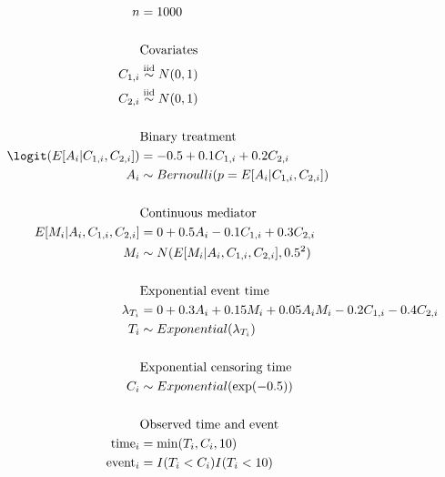 \documentclass[dvipdfmx,10pt]{article}
\begin{document}
\begin{align*}
  n
  &= 1000\\
  \\
  &\text{Covariates}\\
  C_{1,i} &\overset{\text{iid}}{\sim} N(0,1)\\
  C_{2,i} &\overset{\text{iid}}{\sim} N(0,1)\\
  \\
  &\text{Binary treatment}\\
  \logit(E[A_{i} | C_{1,i}, C_{2,i}])
  &= -0.5 + 0.1 C_{1,i} + 0.2 C_{2,i}\\
  A_{i} &\sim Bernoulli(p = E[A_{i} | C_{1,i}, C_{2,i}])\\
  \\
  &\text{Continuous mediator}\\
  E[M_{i} | A_{i}, C_{1,i}, C_{2,i}]
  &= 0 + 0.5 A_{i} - 0.1 C_{1,i} + 0.3 C_{2,i}\\
  M_{i} &\sim N(E[M_{i} | A_{i}, C_{1,i}, C_{2,i}], 0.5^{2})\\
  \\
  &\text{Exponential event time}\\
  \lambda_{T_{i}} &= 0 + 0.3 A_{i} + 0.15 M_{i} + 0.05 A_{i}M_{i} -0.2 C_{1,i} - 0.4 C_{2,i}\\
  T_{i} &\sim Exponential(\lambda_{T_{i}})\\
  \\
  &\text{Exponential censoring time}\\
  C_{i} &\sim Exponential(\exp(-0.5))\\
  \\
  &\text{Observed time and event}\\
  \text{time}_{i} &= \min(T_{i}, C_{i}, 10)\\
  \text{event}_{i} &= I(T_{i} < C_{i}) I(T_{i} < 10)\\
\end{align*}
\end{document}
